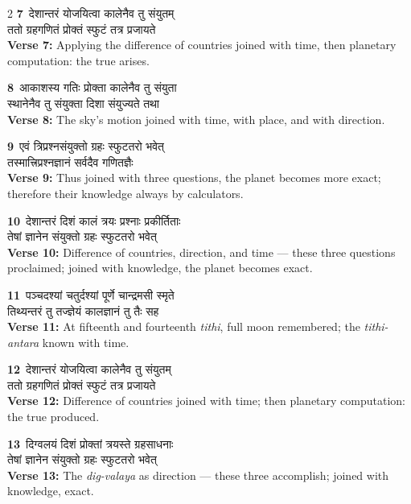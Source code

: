 \documentclass[11pt,a4paper]{article}
\newcommand{\dev}[1]{{\devanagarifont #1}}
\newcommand{\iast}[1]{\textit{#1}}
\newcommand{\vnum}[1]{\textcolor{versenumbercolor}{\textbf{#1}}}
\begin{document}
\begin{paracol}{2}
\switchcolumn[0]
\vnum{7}\ \dev{देशान्तरं योजयित्वा कालेनैव तु संयुतम्}\\
\dev{ततो ग्रहगणितं प्रोक्तं स्फुटं तत्र प्रजायते}\\
\switchcolumn[1]
\textbf{Verse 7:} Applying the difference of countries joined with time, then planetary computation: the true arises.

\switchcolumn[0]
\vnum{8}\ \dev{आकाशस्य गतिः प्रोक्ता कालेनैव तु संयुता}\\
\dev{स्थानेनैव तु संयुक्ता दिशा संयुज्यते तथा}\\
\switchcolumn[1]
\textbf{Verse 8:} The sky's motion joined with time, with place, and with direction.

\switchcolumn[0]
\vnum{9}\ \dev{एवं त्रिप्रश्नसंयुक्तो ग्रहः स्फुटतरो भवेत्}\\
\dev{तस्मात्त्रिप्रश्नज्ञानं सर्वदैव गणितज्ञैः}\\
\switchcolumn[1]
\textbf{Verse 9:} Thus joined with three questions, the planet becomes more exact; therefore their knowledge always by calculators.

\switchcolumn[0]
\vnum{10}\ \dev{देशान्तरं दिशं कालं त्रयः प्रश्नाः प्रकीर्तिताः}\\
\dev{तेषां ज्ञानेन संयुक्तो ग्रहः स्फुटतरो भवेत्}\\
\switchcolumn[1]
\textbf{Verse 10:} Difference of countries, direction, and time --- these three questions proclaimed; joined with knowledge, the planet becomes exact.

\switchcolumn[0]
\vnum{11}\ \dev{पञ्चदश्यां चतुर्दश्यां पूर्णे चान्द्रमसी स्मृते}\\
\dev{तिथ्यन्तरं तु तज्ज्ञेयं कालज्ञानं तु तैः सह}\\
\switchcolumn[1]
\textbf{Verse 11:} At fifteenth and fourteenth \iast{tithi}, full moon remembered; the \iast{tithi-antara} known with time.

\switchcolumn[0]
\vnum{12}\ \dev{देशान्तरं योजयित्वा कालेनैव तु संयुतम्}\\
\dev{ततो ग्रहगणितं प्रोक्तं स्फुटं तत्र प्रजायते}\\
\switchcolumn[1]
\textbf{Verse 12:} Difference of countries joined with time; then planetary computation: the true produced.

\switchcolumn[0]
\vnum{13}\ \dev{दिग्वलयं दिशं प्रोक्तां त्रयस्ते ग्रहसाधनाः}\\
\dev{तेषां ज्ञानेन संयुक्तो ग्रहः स्फुटतरो भवेत्}\\
\switchcolumn[1]
\textbf{Verse 13:} The \iast{dig-valaya} as direction --- these three accomplish; joined with knowledge, exact.


\end{paracol}
\end{document}
